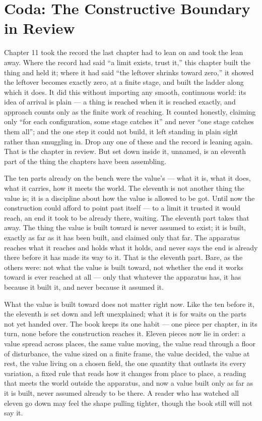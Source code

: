 \section*{Coda: The Constructive Boundary in Review}

Chapter 11 took the record the last chapter had to lean on and took the lean away. Where the record had said ``a limit exists, trust it,'' this chapter built the thing and held it; where it had said ``the leftover shrinks toward zero,'' it showed the leftover becomes exactly zero, at a finite stage, and built the ladder along which it does. It did this without importing any smooth, continuous world: its idea of arrival is plain --- a thing is reached when it is reached exactly, and approach counts only as the finite work of reaching. It counted honestly, claiming only ``for each configuration, some stage catches it'' and never ``one stage catches them all''; and the one step it could not build, it left standing in plain sight rather than smuggling in. Drop any one of these and the record is leaning again. That is the chapter in review. But set down inside it, unnamed, is an eleventh part of the thing the chapters have been assembling.

The ten parts already on the bench were the value's --- what it is, what it does, what it carries, how it meets the world. The eleventh is not another thing the value is; it is a discipline about how the value is allowed to be got. Until now the construction could afford to point past itself --- to a limit it trusted it would reach, an end it took to be already there, waiting. The eleventh part takes that away. The thing the value is built toward is never assumed to exist; it is built, exactly as far as it has been built, and claimed only that far. The apparatus reaches what it reaches and holds what it holds, and never says the end is already there before it has made its way to it. That is the eleventh part. Bare, as the others were: not what the value is built toward, not whether the end it works toward is ever reached at all --- only that whatever the apparatus has, it has because it built it, and never because it assumed it.

What the value is built toward does not matter right now. Like the ten before it, the eleventh is set down and left unexplained; what it is for waits on the parts not yet handed over. The book keeps its one habit --- one piece per chapter, in its turn, none before the construction reaches it. Eleven pieces now lie in order: a value spread across places, the same value moving, the value read through a floor of disturbance, the value sized on a finite frame, the value decided, the value at rest, the value living on a chosen field, the one quantity that outlasts its every variation, a fixed rule that reads how it changes from place to place, a reading that meets the world outside the apparatus, and now a value built only as far as it is built, never assumed already to be there. A reader who has watched all eleven go down may feel the shape pulling tighter, though the book still will not say it.

